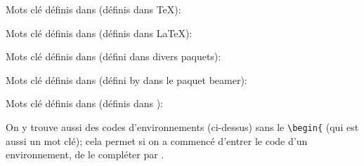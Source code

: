 %
Mots clé définis dans  (définis dans \TeX):
%


Mots clé définis dans  (définis dans \LaTeX):
%


Mots clé définis dans  (défini dans divers paquets):


Mots clé définis dans  (défini by dans le paquet beamer):


Mots clé définis dans  (définis dans \ConTeXt):


On y trouve aussi des codes d'environnements (ci-dessus) sans le \verb|\begin{| (qui est aussi un mot clé); cela permet si on a commencé d'entrer le code d'un environnement, de le compléter par .
